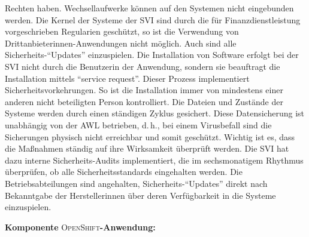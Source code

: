 Rechten haben. Wechsellaufwerke können auf den Systemen nicht eingebunden werden. Die Kernel der Systeme der \ac{SVI} sind durch die für Finanzdienstleistung vorgeschrieben Regularien geschützt, so ist die Verwendung von Drittanbieterinnen-Anwendungen nicht möglich. Auch sind alle Sicherheits-\enquote{Updates} einzuspielen. Die Installation von Software erfolgt bei der \ac{SVI} nicht durch die Benutzerin der Anwendung, sondern sie beauftragt die Installation mittels \enquote{service request}. Dieser Prozess implementiert Sicherheitsvorkehrungen. So ist die Installation immer von mindestens einer anderen nicht beteiligten Person kontrolliert. Die Dateien und Zustände der Systeme werden durch einen ständigen Zyklus gesichert. Diese Datensicherung ist unabhängig von der \ac{AWL} betrieben, d.\,h., bei einem Virusbefall sind die Sicherungen physisch nicht erreichbar und somit geschützt. Wichtig ist es, dass die Maßnahmen ständig auf ihre Wirksamkeit überprüft werden. Die \ac{SVI} hat dazu interne Sicherheits-Audits implementiert, die im sechsmonatigem Rhythmus überprüfen, ob alle Sicherheitsstandards eingehalten werden. Die Betriebsabteilungen sind angehalten, Sicherheits-\enquote{Updates} direkt nach Bekanntgabe der Herstellerinnen über deren Verfügbarkeit in die Systeme einzuspielen.
\par
\textbf{Komponente} \textsc{OpenShift}\textbf{-Anwendung:}
\par
